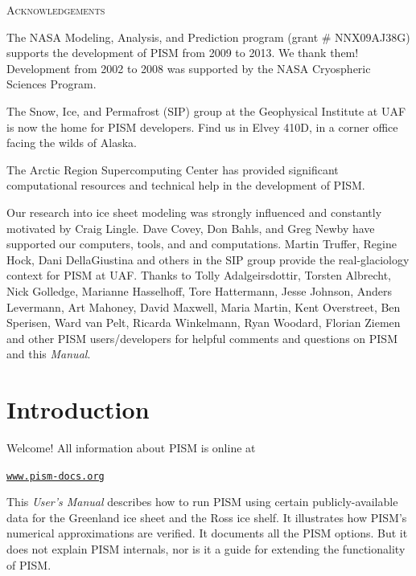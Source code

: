 \documentclass[11pt,final]{amsart}
\renewcommand{\t}[1]{\texttt{#1}}
\begin{document}
\centerline{\textsc{Acknowledgements}}
\bigskip

\small
The NASA Modeling, Analysis, and Prediction program (grant \# NNX09AJ38G) supports the development of PISM from 2009 to 2013.  We thank them!  Development from 2002 to 2008 was supported by the NASA Cryospheric Sciences Program.

The Snow, Ice, and Permafrost (SIP) group at the Geophysical Institute at UAF is now the home for PISM developers.  Find us in Elvey 410D, in a corner office facing the wilds of Alaska.

The Arctic Region Supercomputing Center has provided significant computational resources and technical help in the development of PISM.

Our research into ice sheet modeling was strongly influenced and constantly motivated by Craig Lingle.  Dave Covey, Don Bahls, and Greg Newby have supported our computers, tools, and and computations.  Martin Truffer, Regine Hock, Dani DellaGiustina and others in the SIP group provide the real-glaciology context for PISM at UAF.  Thanks to Tolly Adalgeirsdottir, Torsten Albrecht, Nick Golledge, Marianne Hasselhoff, Tore Hattermann, Jesse Johnson, Anders Levermann, Art Mahoney, David Maxwell, Maria Martin, Kent Overstreet, Ben Sperisen, Ward van Pelt, Ricarda Winkelmann, Ryan Woodard, Florian Ziemen and other PISM users/developers for helpful comments and questions on PISM and this \emph{Manual}.
\normalsize

\newpage
\setcounter{tocdepth}{2}
\small
\tableofcontents
\normalsize

\newpage
\section{Introduction}\label{sect:intro}

Welcome!  All information about PISM is online at
\begin{center}
  \href{http://www.pism-docs.org}{\t{www.pism-docs.org}}
\end{center}

This \emph{User's Manual} describes how to run PISM using certain publicly-available data for the Greenland ice sheet and the Ross ice shelf.  It illustrates how PISM's numerical approximations are verified.  It documents all the PISM options.  But it does not explain PISM internals, nor is it a guide for extending the functionality of PISM.
\end{document}
